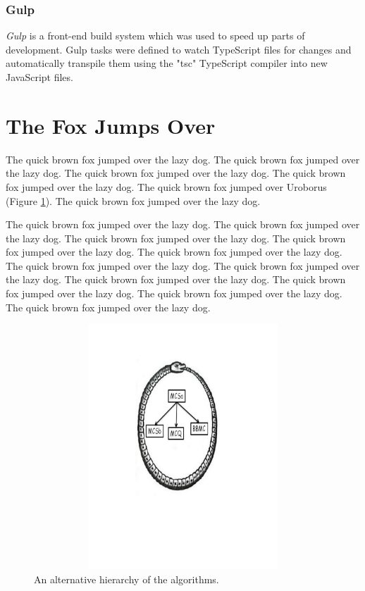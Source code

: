 \documentclass{l4proj}
\begin{document}
        \subsubsection{Gulp}
        \textit{Gulp} is a front-end build system which was used to speed up parts of development. Gulp tasks were defined to watch TypeScript files for changes and automatically transpile them using the "tsc" TypeScript compiler into new JavaScript files. 
        



\section{The Fox Jumps Over}
The quick brown fox jumped over the lazy dog.
The quick brown fox jumped over the lazy dog.
The quick brown fox jumped over the lazy dog.
The quick brown fox jumped over the lazy dog.
The quick brown fox jumped over Uroborus (Figure \ref{uroborus}).
The quick brown fox jumped over the lazy dog.

The quick brown fox jumped over the lazy dog.
The quick brown fox jumped over the lazy dog.
The quick brown fox jumped over the lazy dog.
The quick brown fox jumped over the lazy dog.
The quick brown fox jumped over the lazy dog.
The quick brown fox jumped over the lazy dog.
The quick brown fox jumped over the lazy dog.
The quick brown fox jumped over the lazy dog.
The quick brown fox jumped over the lazy dog.
The quick brown fox jumped over the lazy dog.
The quick brown fox jumped over the lazy dog.

\begin{figure}
\centering
\includegraphics[height=9.2cm,width=13.2cm]{uroboros.pdf}
\vspace{-30mm}
\caption{An alternative hierarchy of the algorithms.}
\label{uroborus}
\end{figure}
\end{document}
